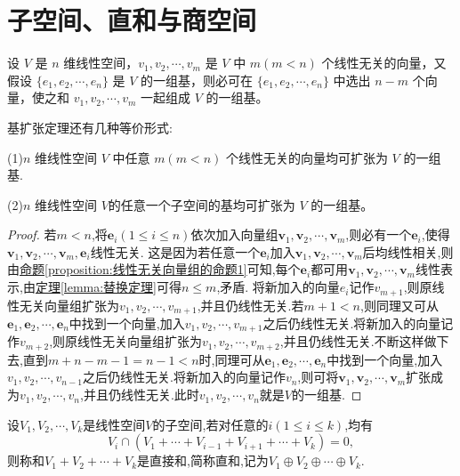 \documentclass[../../main.tex]{subfiles}
\begin{document}
\section{子空间、直和与商空间}

\begin{theorem}[基扩张定理]\label{theorem:基扩张定理}
设 $V$ 是 $n$ 维线性空间，$v_1, v_2, \cdots, v_m$ 是 $V$ 中 $m (m < n)$ 个线性无关的向量，又假设 $\{e_1, e_2, \cdots, e_n\}$ 是 $V$ 的一组基，则必可在 $\{e_1, e_2, \cdots, e_n\}$ 中选出 $n - m$ 个向量，使之和 $v_1, v_2, \cdots, v_m$ 一起组成 $V$ 的一组基。

基扩张定理还有几种等价形式:

(1)$n$ 维线性空间 $V$ 中任意 $m (m < n)$ 个线性无关的向量均可扩张为 $V$ 的一组基.

(2)$n$ 维线性空间 $V$的任意一个子空间的基均可扩张为 $V$ 的一组基。
\end{theorem}
\begin{proof}
若\(m< n\),将\(\boldsymbol{e}_i(1\leqslant  i\leqslant  n)\)依次加入向量组\(\boldsymbol{v}_1,\boldsymbol{v}_2,\cdots,\boldsymbol{v}_m\),则必有一个\(\boldsymbol{e}_i\),使得\(\boldsymbol{v}_1,\boldsymbol{v}_2,\cdots,\boldsymbol{v}_m,\boldsymbol{e}_i\)线性无关. 这是因为若任意一个\(\boldsymbol{e}_i\)加入\(\boldsymbol{v}_1,\boldsymbol{v}_2,\cdots,\boldsymbol{v}_m\)后均线性相关,则由\hyperref[proposition:线性无关向量组的命题1]{命题\ref{proposition:线性无关向量组的命题1}}可知,每个\(\boldsymbol{e}_i\)都可用\(\boldsymbol{v}_1,\boldsymbol{v}_2,\cdots,\boldsymbol{v}_m\)线性表示,由\hyperref[lemma:替换定理]{定理\ref{lemma:替换定理}}可得\(n\leqslant  m\),矛盾. 将新加入的向量$e_i$记作$v_{m+1}$,则原线性无关向量组扩张为$v_1,v_2,\cdots,v_{m+1}$,并且仍线性无关.若\(m + 1< n\),则同理又可从\(\boldsymbol{e}_1,\boldsymbol{e}_2,\cdots,\boldsymbol{e}_n\)中找到一个向量,加入$v_1,v_2,\cdots,v_{m+1}$之后仍线性无关.将新加入的向量记作$v_{m+2}$,则原线性无关向量组扩张为$v_1,v_2,\cdots,v_{m+2}$,并且仍线性无关.不断这样做下去,直到$m+n-m-1=n-1<n$时,同理可从\(\boldsymbol{e}_1,\boldsymbol{e}_2,\cdots,\boldsymbol{e}_n\)中找到一个向量,加入$v_1,v_2,\cdots,v_{n-1}$之后仍线性无关.将新加入的向量记作$v_{n}$,则可将\(\boldsymbol{v}_1,\boldsymbol{v}_2,\cdots,\boldsymbol{v}_m\)扩张成为$v_1,v_2,\cdots,v_{n}$,并且仍线性无关.此时$v_1,v_2,\cdots,v_{n}$就是\(V\)的一组基.
\end{proof}

\begin{definition}[直和]\label{definition:直和}
设\(V_1,V_2,\cdots,V_k\)是线性空间\(V\)的子空间,若对任意的\(i(1\leqslant  i\leqslant  k)\),均有
\[
V_i\cap(V_1+\cdots+V_{i - 1}+V_{i + 1}+\cdots+V_k)=0,
\]
则称和\(V_1 + V_2+\cdots+V_k\)是直接和,简称直和,记为\(V_1\oplus V_2\oplus\cdots\oplus V_k\).
\end{definition}
\end{document}

